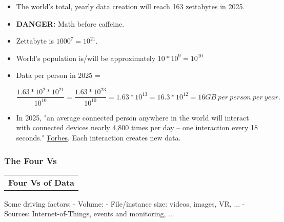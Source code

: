 \documentclass[11pt]{article}
\begin{document}
\begin{itemize}
\item
  The world's total, yearly data creation will reach
  \href{https://www.forbes.com/sites/andrewcave/2017/04/13/what-will-we-do-when-the-worlds-data-hits-163-zettabytes-in-2025/\#43b56b37349a}{163
  zettabytes in 2025.}
\item
  \textbf{DANGER:} Math before caffeine.
\item
  Zettabyte is \(1000^7 = 10^{21}.\)
\item
  World's population is/will be approximately \(10 * 10^{9} = 10^{10}\)
\item
  Data per person in 2025 =

  \begin{equation}
  \frac{1.63 * 10^2 * 10^{21}}{10^{10}} = \frac{1.63 * 10^{23}}{10^{10}} = 1.63 * 10^{13} = 16.3*10^12 = 16GB \ per \ person \ per \ year.
  \end{equation}
\item
  In 2025, "an average connected person anywhere in the world will
  interact with connected devices nearly 4,800 times per day -- one
  interaction every 18 seconds."
  \href{https://www.forbes.com/sites/andrewcave/2017/04/13/what-will-we-do-when-the-worlds-data-hits-163-zettabytes-in-2025/\#43b56b37349a}{Forbes}.
  Each interaction creates new data.
\end{itemize}

    \subsubsection{The Four Vs}\label{the-four-vs}

\begin{longtable}[]{@{}c@{}}
\toprule
\tabularnewline
\midrule
\endhead
\textbf{Four Vs of Data}\tabularnewline
\bottomrule
\end{longtable}

    Some driving factors: - Volume: - File/instance size: videos, images,
VR, ... - Sources: Internet-of-Things, events and monitoring, ...
\end{document}
